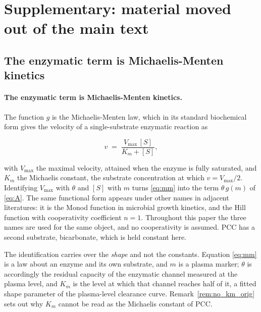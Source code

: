 \section{Supplementary: material moved out of the main text}
\label{sec:supp}

\subsection{The enzymatic term is Michaelis-Menten kinetics}

\paragraph{The enzymatic term is Michaelis-Menten kinetics.} The function $g$ is the
Michaelis-Menten law, which in its standard biochemical form gives the velocity of a
single-substrate enzymatic reaction as

\begin{equation}
v \;=\; \frac{V_{\max}\,[S]}{K_m + [S]},
\label{eq:mm}
\end{equation}

with $V_{\max}$ the maximal velocity, attained when the enzyme is fully saturated, and
$K_m$ the Michaelis constant, the substrate concentration at which $v = V_{\max}/2$.
Identifying $V_{\max}$ with $\theta$ and $[S]$ with $m$ turns \eqref{eq:mm} into the term
$\theta\, g(m)$ of \eqref{eq:A}. The same functional form appears under other names in
adjacent literatures: it is the Monod function in microbial growth kinetics, and the Hill
function with cooperativity coefficient $n = 1$. Throughout this paper the three names are
used for the same object, and no cooperativity is assumed. PCC has a second substrate,
bicarbonate, which is held constant here.

The identification carries over the \emph{shape} and not the constants. Equation
\eqref{eq:mm} is a law about an enzyme and its own substrate, and $m$ is a plasma marker;
$\theta$ is accordingly the residual capacity of the enzymatic channel measured at the
plasma level, and $K_m$ is the level at which that channel reaches half of it, a fitted
shape parameter of the plasma-level clearance curve. Remark~\ref{rem:no_km_orig} sets out why
$K_m$ cannot be read as the Michaelis constant of PCC.

